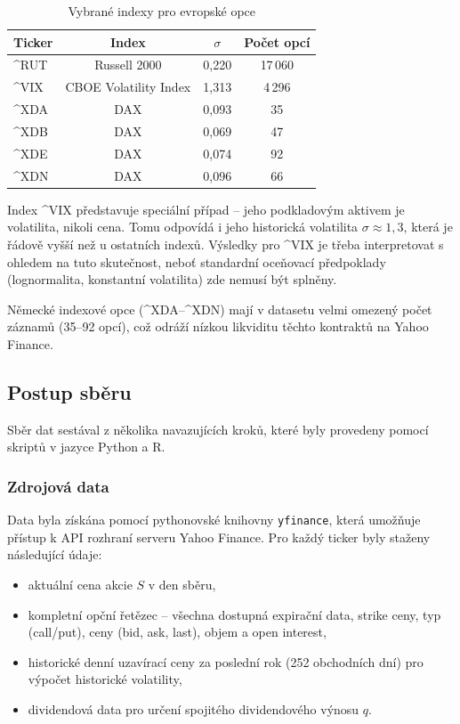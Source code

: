 \begin{table}[h]
\centering
\caption{Vybrané indexy pro evropské opce}
\label{tab:selected_indices}
\begin{tabular}{lccc}
\toprule
\textbf{Ticker} & \textbf{Index} & \(\sigma\) & \textbf{Počet opcí} \\
\midrule
\^{}RUT & Russell 2000              & 0{,}220 & 17\,060 \\
\^{}VIX & CBOE Volatility Index     & 1{,}313 & 4\,296 \\
\^{}XDA & DAX                       & 0{,}093 & 35 \\
\^{}XDB & DAX                       & 0{,}069 & 47 \\
\^{}XDE & DAX                       & 0{,}074 & 92 \\
\^{}XDN & DAX                       & 0{,}096 & 66 \\
\bottomrule
\end{tabular}
\end{table}

Index \^{}VIX představuje speciální případ – jeho podkladovým aktivem je volatilita, nikoli cena. Tomu odpovídá i jeho historická volatilita \(\sigma \approx 1{,}3\), která je řádově vyšší než u ostatních indexů. Výsledky pro \^{}VIX je třeba interpretovat s ohledem na tuto skutečnost, neboť standardní oceňovací předpoklady (lognormalita, konstantní volatilita) zde nemusí být splněny.

Německé indexové opce (\^{}XDA{}--\^{}XDN) mají v datasetu velmi omezený počet záznamů (35–92 opcí), což odráží nízkou likviditu těchto kontraktů na Yahoo Finance.

\subsection{Postup sběru}

Sběr dat sestával z několika navazujících kroků, které byly provedeny pomocí skriptů v jazyce Python a R.

\subsubsection{Zdrojová data}

Data byla získána pomocí pythonovské knihovny \texttt{yfinance}, která umožňuje přístup k API rozhraní serveru Yahoo Finance. Pro každý ticker byly staženy následující údaje:
\begin{itemize}
  \item aktuální cena akcie \(S\) v den sběru,
  \item kompletní opční řetězec -- všechna dostupná expirační data, strike ceny, typ (call/put), ceny (bid, ask, last), objem a open interest,
  \item historické denní uzavírací ceny za poslední rok (252 obchodních dní) pro výpočet historické volatility,
  \item dividendová data pro určení spojitého dividendového výnosu \(q\).
\end{itemize}

